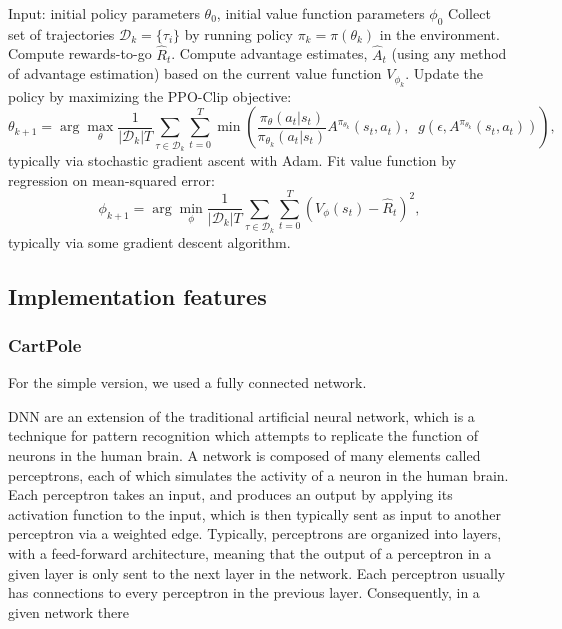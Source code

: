 \documentclass[12pt,a4paper]{article}
\begin{document}
\begin{algorithmic}[1]
    \STATE Input: initial policy parameters $\theta_0$, initial value function parameters $\phi_0$
    \STATE Collect set of trajectories ${\mathcal D}_k = \{\tau_i\}$ by running policy $\pi_k = \pi(\theta_k)$ in the environment.
    \STATE Compute rewards-to-go $\hat{R}_t$.
    \STATE Compute advantage estimates, $\hat{A}_t$ (using any method of advantage estimation) based on the current value function $V_{\phi_k}$.
    \STATE Update the policy by maximizing the PPO-Clip objective:
        \begin{equation*}
        \theta_{k+1} = \arg \max_{\theta} \frac{1}{|{\mathcal D}_k| T} \sum_{\tau \in {\mathcal D}_k} \sum_{t=0}^T \min\left(
            \frac{\pi_{\theta}(a_t|s_t)}{\pi_{\theta_k}(a_t|s_t)}  A^{\pi_{\theta_k}}(s_t,a_t), \;\;
            g(\epsilon, A^{\pi_{\theta_k}}(s_t,a_t))
        \right),
        \end{equation*}
        typically via stochastic gradient ascent with Adam.
    \STATE Fit value function by regression on mean-squared error:
        \begin{equation*}
        \phi_{k+1} = \arg \min_{\phi} \frac{1}{|{\mathcal D}_k| T} \sum_{\tau \in {\mathcal D}_k} \sum_{t=0}^T\left( V_{\phi} (s_t) - \hat{R}_t \right)^2,
        \end{equation*}
        typically via some gradient descent algorithm.
    \ENDFOR
\end{algorithmic}

\subsection{Implementation features}
\subsubsection{CartPole}
For the simple version, we used a fully connected network.

DNN are an extension of the traditional artificial neural network, which is a
technique for pattern recognition which attempts to replicate the function of neurons in the
human brain. A network is composed of many elements called perceptrons, each of which
simulates the activity of a neuron in the human brain. Each perceptron takes an input, and
produces an output by applying its activation function to the input, which is then typically
sent as input to another perceptron via a weighted edge. Typically, perceptrons are organized
into layers, with a feed-forward architecture, meaning that the output of a perceptron in a
given layer is only sent to the next layer in the network. Each perceptron usually has
connections to every perceptron in the previous layer. Consequently, in a given network there 
\end{document}
